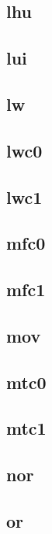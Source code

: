 \documentclass{article}
\begin{document}
\subsection*{lhu}

\subsection*{lui}

\subsection*{lw}

\subsection*{lwc0}

\subsection*{lwc1}

\subsection*{mfc0}

\subsection*{mfc1}

\subsection*{mov}

\subsection*{mtc0}

\subsection*{mtc1}

\subsection*{nor}

\subsection*{or}
\end{document}
